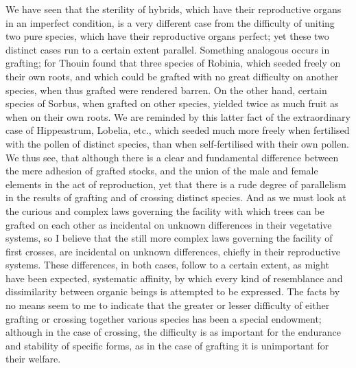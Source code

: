 We have seen that the sterility of hybrids, which have their reproductive organs in an imperfect condition, is a very different case from the difficulty of uniting two pure species, which have their reproductive organs perfect; yet these two distinct cases run to a certain extent parallel. Something analogous occurs in grafting; for Thouin found that three species of Robinia, which seeded freely on their own roots, and which could be grafted with no great difficulty on another species, when thus grafted were rendered barren. On the other hand, certain species of Sorbus, when grafted on other species, yielded twice as much fruit as when on their own roots. We are reminded by this latter fact of the extraordinary case of Hippeastrum, Lobelia, etc., which seeded much more freely when fertilised with the pollen of distinct species, than when self-fertilised with their own pollen.
We thus see, that although there is a clear and fundamental difference between the mere adhesion of grafted stocks, and the union of the male and female elements in the act of reproduction, yet that there is a rude degree of parallelism in the results of grafting and of crossing distinct species. And as we must look at the curious and complex laws governing the facility with which trees can be grafted on each other as incidental on unknown differences in their vegetative systems, so I believe that the still more complex laws governing the facility of first crosses, are incidental on unknown differences, chiefly in their reproductive systems. These differences, in both cases, follow to a certain extent, as might have been expected, systematic affinity, by which every kind of resemblance and dissimilarity between organic beings is attempted to be expressed. The facts by no means seem to me to indicate that the greater or lesser difficulty of either grafting or crossing together various species has been a special endowment; although in the case of crossing, the difficulty is as important for the endurance and stability of specific forms, as in the case of grafting it is unimportant for their welfare.

